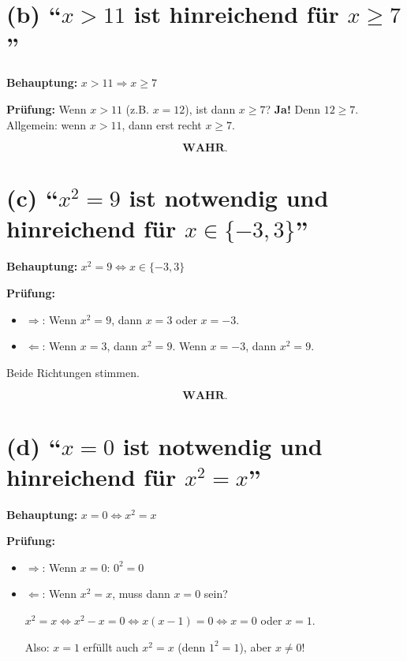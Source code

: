 \documentclass[12pt, a4paper]{article}
\begin{document}
\section*{(b) "`$x > 11$ ist hinreichend für $x \geq 7$"'}

\textbf{Behauptung:} $x > 11 \Rightarrow x \geq 7$

\textbf{Prüfung:} Wenn $x > 11$ (z.B. $x = 12$), ist dann $x \geq 7$? \textbf{Ja!} Denn $12 \geq 7$. Allgemein: wenn $x > 11$, dann erst recht $x \geq 7$.

\[
    \boxed{\textbf{WAHR.}}
\]

\section*{(c) "`$x^2 = 9$ ist notwendig und hinreichend für $x \in \{-3, 3\}$"'}

\textbf{Behauptung:} $x^2 = 9 \Leftrightarrow x \in \{-3, 3\}$

\textbf{Prüfung:}
\begin{itemize}
    \item $\Rightarrow$: Wenn $x^2 = 9$, dann $x = 3$ oder $x = -3$. \checkmark
    \item $\Leftarrow$: Wenn $x = 3$, dann $x^2 = 9$. Wenn $x = -3$, dann $x^2 = 9$. \checkmark
\end{itemize}

Beide Richtungen stimmen.

\[
    \boxed{\textbf{WAHR.}}
\]

\section*{(d) "`$x = 0$ ist notwendig und hinreichend für $x^2 = x$"'}

\textbf{Behauptung:} $x = 0 \Leftrightarrow x^2 = x$

\textbf{Prüfung:}
\begin{itemize}
    \item $\Rightarrow$: Wenn $x = 0$: $0^2 = 0$ \checkmark
    \item $\Leftarrow$: Wenn $x^2 = x$, muss dann $x = 0$ sein?

    $x^2 = x \Leftrightarrow x^2 - x = 0 \Leftrightarrow x(x - 1) = 0 \Leftrightarrow x = 0$ oder $x = 1$.

    Also: $x = 1$ erfüllt auch $x^2 = x$ (denn $1^2 = 1$), aber $x \neq 0$!
\end{itemize}
\end{document}
